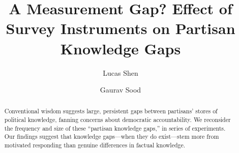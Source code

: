 \documentclass[12pt, letterpaper]{article}
\title{A Measurement Gap? Effect of Survey Instruments on Partisan Knowledge Gaps}
\author{Lucas Shen \and Gaurav Sood}
\begin{document}
\maketitle
\thispagestyle{empty}

\begin{abstract}

\noindent Conventional wisdom suggests large, persistent gaps between partisans' stores of political knowledge, fanning concerns about democratic accountability. We reconsider the frequency and size of these ``partisan knowledge gaps,'' in  series of experiments. Our findings suggest that knowledge gaps---when they do exist---stem more from motivated responding than genuine differences in factual knowledge.

\end{abstract}

\vspace{.2in}

\newpage

\doublespacing


\end{document}

